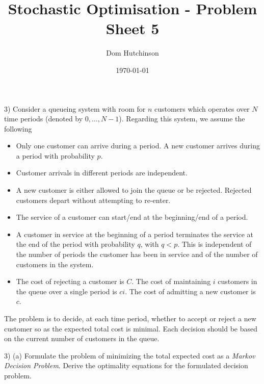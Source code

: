 \documentclass[11pt,a4paper]{article}
\begin{document}

\title{Stochastic Optimisation - Problem Sheet 5}
\author{Dom Hutchinson}
\date{\today}
\maketitle

\begin{question}{3)}
  Consider a queueing system with room for $n$ customers which operates over $N$ time periods (denoted by $0,\dots,N-1$). Regarding this system, we assume the following
  \begin{itemize}
    \item Only one customer can arrive during a period. A new customer arrives during a period with probability $p$.
    \item Customer arrivals in different periods are independent.
    \item A new customer is either allowed to join the queue or be rejected. Rejected customers depart without attempting to re-enter.
    \item The service of a customer can start/end at the beginning/end of a period.
    \item A customer in service at the beginning of a period terminates the service at the end of the period with probability $q$, with $q<p$. This is independent of the number of periods the customer has been in service and of the number of customers in the system.
    \item The cost of rejecting a customer is $C$. The cost of maintaining $i$ customers in the queue over a single period is $ci$. The cost of admitting a new customer is $c$.
  \end{itemize}
  The problem is to decide, at each time period, whether to accept or reject a new customer so as the expected total cost is minimal. Each decision should be based on the current number of customers in the queue.
\end{question}

\begin{question}{3) (a)}
  Formulate the problem of minimizing the total expected cost as a \textit{Markov Decision Problem}. Derive the optimality equations for the formulated decision problem.
\end{question}
\end{document}
